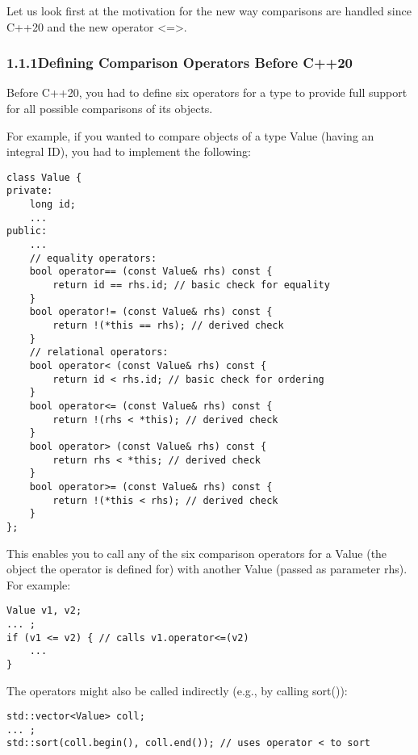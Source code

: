 Let us look first at the motivation for the new way comparisons are handled since C++20 and the new operator <=>.

\subsubsection*{ 1.1.1\hspace{0.2cm}Defining Comparison Operators Before C++20}

Before C++20, you had to define six operators for a type to provide full support for all possible comparisons of its objects.

For example, if you wanted to compare objects of a type Value (having an integral ID), you had to implement the following:

\begin{lstlisting}[style=styleCXX]
class Value {
private:
	long id;
	...
public:
	...
	// equality operators:
	bool operator== (const Value& rhs) const {
		return id == rhs.id; // basic check for equality
	}
	bool operator!= (const Value& rhs) const {
		return !(*this == rhs); // derived check
	}
	// relational operators:
	bool operator< (const Value& rhs) const {
		return id < rhs.id; // basic check for ordering
	}
	bool operator<= (const Value& rhs) const {
		return !(rhs < *this); // derived check
	}
	bool operator> (const Value& rhs) const {
		return rhs < *this; // derived check
	}
	bool operator>= (const Value& rhs) const {
		return !(*this < rhs); // derived check
	}
};
\end{lstlisting}

This enables you to call any of the six comparison operators for a Value (the object the operator is defined for) with another Value (passed as parameter rhs). For example:

\begin{lstlisting}[style=styleCXX]
Value v1, v2;
... ;
if (v1 <= v2) { // calls v1.operator<=(v2)
	...
}
\end{lstlisting}

The operators might also be called indirectly (e.g., by calling sort()):

\begin{lstlisting}[style=styleCXX]
std::vector<Value> coll;
... ;
std::sort(coll.begin(), coll.end()); // uses operator < to sort
\end{lstlisting}

